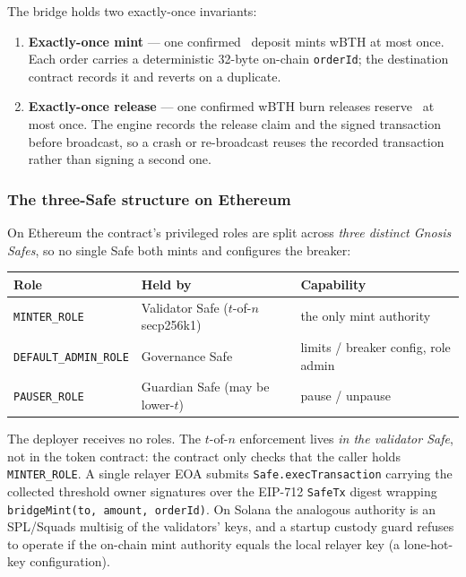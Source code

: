 The bridge holds two exactly-once invariants:
\begin{enumerate}
  \item \textbf{Exactly-once mint} --- one confirmed \BTH\ deposit mints wBTH at
    most once. Each order carries a deterministic 32-byte on-chain
    \texttt{orderId}; the destination contract records it and reverts on a
    duplicate.
  \item \textbf{Exactly-once release} --- one confirmed wBTH burn releases
    reserve \BTH\ at most once. The engine records the release claim and the
    signed transaction before broadcast, so a crash or re-broadcast reuses the
    recorded transaction rather than signing a second one.
\end{enumerate}

\subsubsection{The three-Safe structure on Ethereum}

On Ethereum the contract's privileged roles are split across \emph{three
distinct Gnosis Safes}, so no single Safe both mints and configures the
breaker:
\begin{center}
\begin{tabular}{lll}
\toprule
\textbf{Role} & \textbf{Held by} & \textbf{Capability} \\
\midrule
\texttt{MINTER\_ROLE} & Validator Safe ($t$-of-$n$ secp256k1) & the only mint authority \\
\texttt{DEFAULT\_ADMIN\_ROLE} & Governance Safe & limits / breaker config, role admin \\
\texttt{PAUSER\_ROLE} & Guardian Safe (may be lower-$t$) & pause / unpause \\
\bottomrule
\end{tabular}
\end{center}
The deployer receives no roles. The $t$-of-$n$ enforcement lives \emph{in the
validator Safe}, not in the token contract: the contract only checks that the
caller holds \texttt{MINTER\_ROLE}. A single relayer EOA submits
\texttt{Safe.execTransaction} carrying the collected threshold owner
signatures over the EIP-712 \texttt{SafeTx} digest wrapping
\texttt{bridgeMint(to, amount, orderId)}. On Solana the analogous authority is
an SPL/Squads multisig of the validators' keys, and a startup custody guard
refuses to operate if the on-chain mint authority equals the local relayer key
(a lone-hot-key configuration).

